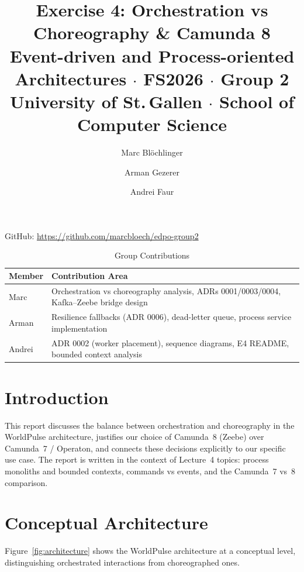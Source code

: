 \documentclass[10pt,a4paper]{article}
\title{Exercise 4: Orchestration vs Choreography \& Camunda 8\\[0.5em]
\large Event-driven and Process-oriented Architectures $\cdot$ FS2026 $\cdot$ Group 2\\
University of St.\,Gallen $\cdot$ School of Computer Science}
\author{Marc Bl\"ochlinger \and Arman Gezerer \and Andrei Faur}
\date{}
\begin{document}
\maketitle

\noindent GitHub: \url{https://github.com/marcbloech/edpo-group2}

\begin{table}[h]
    \centering
    \caption{Group Contributions}
    \begin{tabular}{
        >{\raggedright\arraybackslash}p{}
        >{\raggedright\arraybackslash}p{}
    }
    \toprule
    \textbf{Member} & \textbf{Contribution Area} \\
    \midrule
    Marc   & Orchestration vs choreography analysis, ADRs 0001/0003/0004, Kafka--Zeebe bridge design \\
    Arman  & Resilience fallbacks (ADR 0006), dead-letter queue, process service implementation \\
    Andrei & ADR 0002 (worker placement), sequence diagrams, E4 README, bounded context analysis \\
    \bottomrule
    \end{tabular}
\end{table}


\section{Introduction}

This report discusses the balance between orchestration and choreography in the WorldPulse architecture, justifies our choice of Camunda~8 (Zeebe) over Camunda~7 / Operaton, and connects these decisions explicitly to our specific use case. The report is written in the context of Lecture~4 topics: process monoliths and bounded contexts, commands vs events, and the Camunda~7 vs~8 comparison.


\section{Conceptual Architecture}

Figure~\ref{fig:architecture} shows the WorldPulse architecture at a conceptual level, distinguishing orchestrated interactions from choreographed ones.

\end{document}
